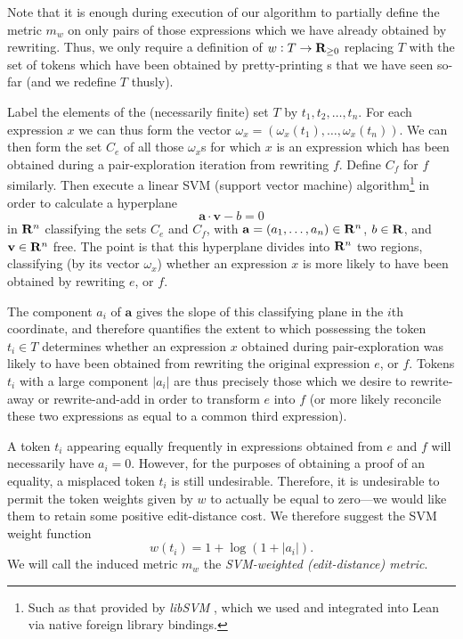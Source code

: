 \documentclass[12pt]{article}
\begin{document}
Note that it is enough during execution of our algorithm to partially define the metric $m_w$ on only pairs of those expressions which we have already obtained by rewriting. Thus, we only require a definition of $w : T \to \mathbf{R}_{\geq 0}$ replacing $T$ with the set of tokens which have been obtained by pretty-printing \expr{}s that we have seen so-far (and we redefine $T$ thusly).

Label the elements of the (necessarily finite) set $T$ by $t_1, t_2, \ldots, t_n$. For each expression $x$ we can thus form the vector $\omega_x = (\omega_x(t_1), \ldots, \omega_x(t_n))$. We can then form the set $C_e$ of all those $\omega_x$s for which $x$ is an expression which has been obtained during a pair-exploration iteration from rewriting $f$. Define $C_f$ for $f$ similarly. Then execute a linear SVM (support vector machine) algorithm\footnote{Such as that provided by \textit{libSVM} \cite{chang2011libsvm}, which we used and integrated into Lean via native foreign library bindings.} in order to calculate a hyperplane
\begin{equation*}
  \mathbf{a} \cdot \mathbf{v} - b = 0
\end{equation*}
in $\mathbf{R}^{n}$ classifying the sets $C_e$ and $C_f$, with $\mathbf{a} = (a_1, \ldots, a_n) \in \mathbf{R}^n$, $b \in \mathbf{R}$, and $\mathbf{v} \in \mathbf{R}^n$ free. The point is that this hyperplane divides into $\mathbf{R}^n$ two regions, classifying (by its vector $\omega_x$) whether an expression $x$ is more likely to have been obtained by rewriting $e$, or $f$.

The component $a_i$ of $\mathbf{a}$ gives the slope of this classifying plane in the $i$th coordinate, and therefore quantifies the extent to which possessing the token $t_i \in T$ determines whether an expression $x$ obtained during pair-exploration was likely to have been obtained from rewriting the original expression $e$, or $f$. Tokens $t_i$ with a large component $\lvert a_i \rvert$ are thus precisely those which we desire to rewrite-away or rewrite-and-add in order to transform $e$ into $f$ (or more likely reconcile these two expressions as equal to a common third expression).

A token $t_i$ appearing equally frequently in expressions obtained from $e$ and $f$ will necessarily have $a_i = 0$. However, for the purposes of obtaining a proof of an equality, a misplaced token $t_i$ is still undesirable. Therefore, it is undesirable to permit the token weights given by $w$ to actually be equal to zero---we would like them to retain some positive edit-distance cost. We therefore suggest the SVM weight function
\begin{equation*}
  w(t_i) = 1 + \log(1 + \lvert a_i \rvert).
\end{equation*}
We will call the induced metric $m_w$ the \textit{SVM-weighted (edit-distance) metric}.
\end{document}
